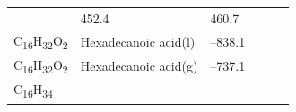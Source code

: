 \documentclass[
]{book}
\theoremstyle{definition}
\theoremstyle{definition}
\theoremstyle{definition}
\theoremstyle{remark}
\begin{document}
\begin{longtable}[]{@{}llllll@{}}
\begin{minipage}[t]{0.15\columnwidth}
\strut
\end{minipage} & \begin{minipage}[t]{0.14\columnwidth}\raggedright
452.4\strut
\end{minipage} & \begin{minipage}[t]{0.14\columnwidth}\raggedright
460.7\strut
\end{minipage}\tabularnewline
\begin{minipage}[t]{0.07\columnwidth}\raggedright
C\textsubscript{16}H\textsubscript{32}O\textsubscript{2}\strut
\end{minipage} & \begin{minipage}[t]{0.17\columnwidth}\raggedright
Hexadecanoic acid(l)\strut
\end{minipage} & \begin{minipage}[t]{0.15\columnwidth}\raggedright
--838.1\strut
\end{minipage} & \begin{minipage}[t]{0.15\columnwidth}\raggedright
\strut
\end{minipage} & \begin{minipage}[t]{0.14\columnwidth}\raggedright
\strut
\end{minipage} & \begin{minipage}[t]{0.14\columnwidth}\raggedright
\strut
\end{minipage}\tabularnewline
\begin{minipage}[t]{0.07\columnwidth}\raggedright
C\textsubscript{16}H\textsubscript{32}O\textsubscript{2}\strut
\end{minipage} & \begin{minipage}[t]{0.17\columnwidth}\raggedright
Hexadecanoic acid(g)\strut
\end{minipage} & \begin{minipage}[t]{0.15\columnwidth}\raggedright
--737.1\strut
\end{minipage} & \begin{minipage}[t]{0.15\columnwidth}\raggedright
\strut
\end{minipage} & \begin{minipage}[t]{0.14\columnwidth}\raggedright
\strut
\end{minipage} & \begin{minipage}[t]{0.14\columnwidth}\raggedright
\strut
\end{minipage}\tabularnewline
\begin{minipage}[t]{0.07\columnwidth}\raggedright
C\textsubscript{16}H\textsubscript{34}\strut
\end{minipage} & \begin{minipage}[t]{0.17\columnwidth}\raggedright

\end{minipage}
\end{longtable}
\end{document}
